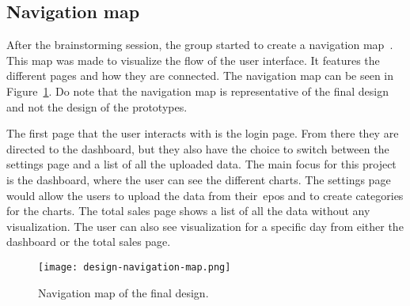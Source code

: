 \subsection{Navigation map}\label{subsec:navigation-map}

After the brainstorming session, the group started to create a navigation map~\cite{benyon2019}.
This map was made to visualize the flow of the user interface.
It features the different pages and how they are connected.
The navigation map can be seen in Figure~\ref{fig:navigation-map}.
Do note that the navigation map is representative of the final design and not the design of the prototypes.

The first page that the user interacts with is the login page.
From there they are directed to the dashboard, but they also have the choice to switch between the settings page and a
list of all the uploaded data.
The main focus for this project is the dashboard, where the user can see the different charts.
The settings page would allow the users to upload the data from their~\acrshort{epos} and to create categories for the
charts.
The total sales page shows a list of all the data without any visualization.
The user can also see visualization for a specific day from either the dashboard or the total sales page.

\begin{figure}[H]
    \centering
    \texttt{[image: design-navigation-map.png]}
    \caption{Navigation map of the final design.
    }\label{fig:navigation-map}
\end{figure}
